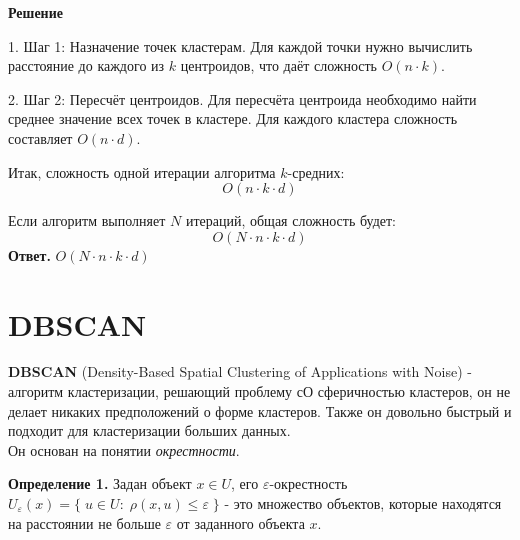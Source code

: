 \textbf{Решение}

1. Шаг 1: Назначение точек кластерам.
   Для каждой точки нужно вычислить расстояние до каждого из \(k\) центроидов, что даёт сложность \(O(n \cdot k)\).

2. Шаг 2: Пересчёт центроидов.
   Для пересчёта центроида необходимо найти среднее значение всех точек в кластере. Для каждого кластера сложность составляет \(O(n \cdot d)\).

Итак, сложность одной итерации алгоритма \(k\)-средних: 
\[
O(n \cdot k \cdot d)
\]

Если алгоритм выполняет \(N\) итераций, общая сложность будет:
\[
O(N \cdot n \cdot k \cdot d)
\]
\textbf{Ответ.} $O(N \cdot n \cdot k \cdot d)$


\section{DBSCAN}

\textbf{DBSCAN} (Density-Based Spatial Clustering of Applications with Noise) - алгоритм кластеризации, решающий проблему сО сферичностью кластеров, он не делает никаких предположений о форме кластеров. Также он довольно быстрый и подходит для кластеризации больших данных.
\\
Он основан на понятии {\textit{окрестности}}.

\textbf{Определение 1.} Задан объект $x \in U$, его $\varepsilon$-окрестность $U_\varepsilon (x) = \{\;u\in U:\; \rho (x,u) \leq \varepsilon \;\}$ - это множество объектов, которые находятся на расстоянии не больше $\varepsilon$ от заданного объекта $x$.

\newcommand{\abs}[1]{\left|#1\right|}

